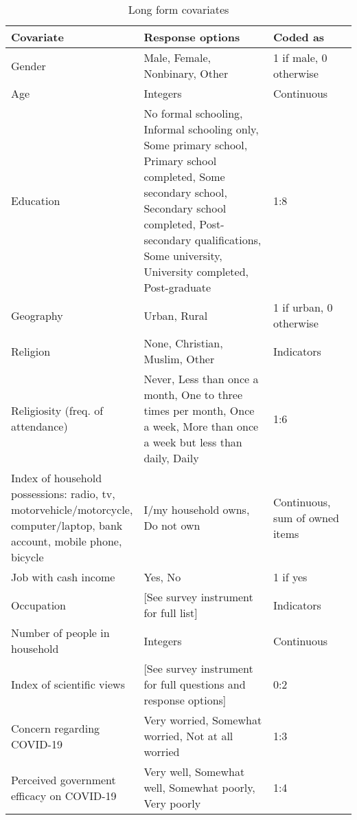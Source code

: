 \begin{table}[H]
\begin{tabular}{p{0.35\linewidth}p{0.4\linewidth}p{0.25\linewidth}}
\textbf{Covariate}                   & \textbf{Response options} & \textbf{Coded as}                                     \\
\hline
Gender                                      & Male,   Female, Nonbinary, Other                           & 1 if male, 0 otherwise  \\
Age                                         & Integers                                                   & Continuous              \\
Education &
  No   formal schooling, Informal schooling only, Some primary school, Primary   school completed, Some secondary school, Secondary school completed,   Post-secondary qualifications, Some university, University completed,   Post-graduate &
  1:8 \\
Geography                                   & Urban, Rural                                 & 1 if urban, 0 otherwise \\
Religion                                    & None,   Christian, Muslim, Other                           & Indicators              \\
Religiosity   (freq. of attendance) &
  Never,   Less than once a month, One to three times per month, Once a week, More than   once a week but less than daily, Daily &
  1:6 \\
Index of household possessions:   radio, tv, motorvehicle/motorcycle, computer/laptop, bank account, mobile   phone, bicycle &
  I/my household owns, Do not own &
  Continuous, sum of owned items \\
Job   with cash income                      & Yes,   No                                                  & 1 if yes                \\
Occupation                                  & {[}See   survey instrument for full list{]}                & Indicators              \\
Number   of people in household             & Integers                                                   & Continuous              \\
Index   of scientific views                 & {[}See   survey instrument for full questions and response options{]} & 0:2                     \\
Concern regarding COVID-19                  & Very   worried, Somewhat worried, Not at all worried       & 1:3                     \\
Perceived government efficacy   on COVID-19 & Very   well, Somewhat well, Somewhat poorly, Very poorly   & 1:4                    
\end{tabular}
\caption{Long form covariates}
\label{cov_long}
\end{table}